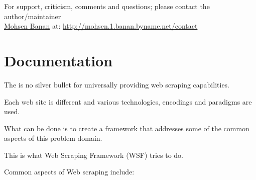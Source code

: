 \documentclass{article}
\begin{document}
For support, criticism, comments and questions; please contact the 
author/maintainer \\
\href{http://mohsen.1.banan.byname.net}{Mohsen Banan} at: \url{http://mohsen.1.banan.byname.net/contact}


\section{Documentation}

The is no silver bullet for universally providing web scraping capabilities.

Each web site is different and various technologies, encodings and paradigms are used.

What can be done is to create a framework that addresses some of the common aspects of this problem domain.

This is what Web Scraping Framework (WSF) tries to do.

Common aspects of Web scraping include:
\end{document}
